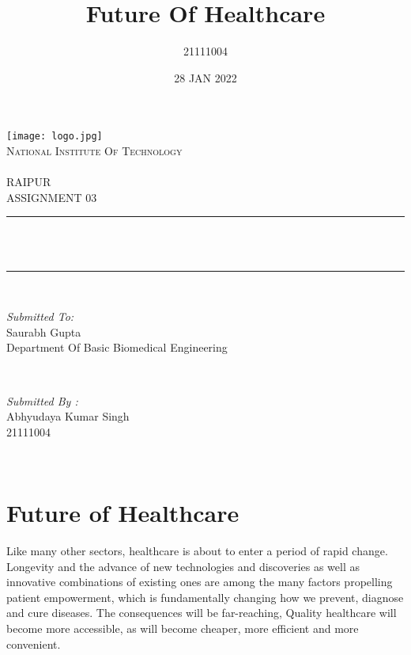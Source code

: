 \documentclass[12pt]{article}
\title{Future Of Healthcare}
\author{21111004}
\date{28 JAN 2022}
\makeatletter
\let\thetitle\@title
\makeatother
\begin{document}
\begin{titlepage}
	\centering
    \texttt{[image: logo.jpg]}\\[1.0 cm]	
    \textsc{\LARGE National Institute Of Technology \newline\\\\ RAIPUR}\\[2.0 CM]
    
	\textsc{\Large ASSIGNMENT 03}\\[0.5 cm]				%
	\rule{\linewidth}{0.4 mm} \\[0.4 cm]
	{ \huge \bfseries \thetitle}\\
	\rule{\linewidth}{0.4 mm} \\[1.5 cm]
	
	\begin{minipage}{0.6\textwidth}
		\begin{flushleft} \large
			\emph{Submitted To:}\\
			Saurabh Gupta\\
            Department Of Basic Biomedical Engineering\\
			\end{flushleft}
			\end{minipage}~
			\begin{minipage}{0.4\textwidth}
            
			\begin{flushright} \large
			\emph{Submitted By :}\\
			Abhyudaya Kumar Singh\\
            21111004\\
		\end{flushright}
        
	\end{minipage}\\[2 cm]
\end{titlepage}

\tableofcontents
\pagebreak

\section{Future of Healthcare}
Like many other sectors, healthcare is about to enter a period of rapid change. Longevity and the advance of new technologies and discoveries as well as innovative combinations of existing ones are among the many factors propelling patient empowerment, which is fundamentally changing how we prevent, diagnose and cure diseases. The consequences will be far-reaching, Quality healthcare will become more accessible, as will become cheaper, more efficient and more convenient.
\end{document}
